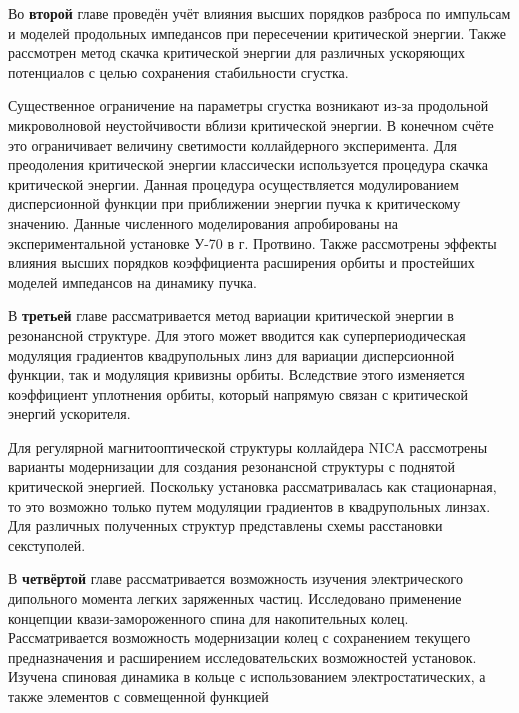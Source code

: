 Во \textbf{второй} главе проведён учёт влияния высших порядков разброса по импульсам и моделей продольных импедансов при пересечении критической энергии. Также рассмотрен метод скачка критической энергии для различных ускоряющих потенциалов с целью сохранения стабильности сгустка.

\par Существенное ограничение на параметры сгустка возникают из-за продольной микроволновой неустойчивости вблизи критической энергии. В конечном счёте это ограничивает величину светимости коллайдерного эксперимента. Для преодоления критической энергии классически используется процедура скачка критической энергии. Данная процедура осуществляется модулированием дисперсионной функции при приближении энергии пучка к критическому значению. Данные численного моделирования апробированы на экспериментальной установке У-70 в г. Протвино. Также рассмотрены эффекты влияния высших порядков коэффициента расширения орбиты и простейших моделей импедансов на динамику пучка.

В \textbf{третьей} главе рассматривается метод вариации критической энергии в резонансной структуре. Для этого может вводится как суперпериодическая модуляция градиентов квадрупольных линз для вариации дисперсионной функции, так и модуляция кривизны орбиты. Вследствие этого изменяется коэффициент уплотнения орбиты, который напрямую связан с критической энергий ускорителя.

\par Для регулярной магнитооптической структуры коллайдера NICA рассмотрены варианты модернизации для создания резонансной структуры с поднятой критической энергией. Поскольку установка рассматривалась как стационарная, то это возможно только путем модуляции градиентов в квадрупольных линзах. Для различных полученных структур представлены схемы расстановки секступолей.

В \textbf{четвёртой} главе рассматривается возможность изучения электрического дипольного момента легких заряженных частиц. Исследовано применение концепции квази-замороженного спина для накопительных колец. Рассматривается возможность модернизации колец с сохранением текущего предназначения  и расширением исследовательских возможностей установок. Изучена спиновая динамика в кольце с использованием электростатических, а также элементов с совмещенной функцией

